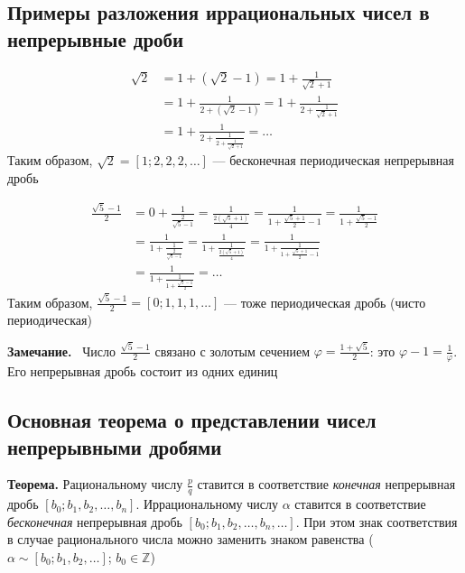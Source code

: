 \documentclass[a4paper,12pt]{article}
\newcommand{\myremark}{\textbf{Замечание.}\ }
\theoremstyle{definition}
\theoremstyle{plain}
\theoremstyle{remark}
\begin{document}
	\subsection{Примеры разложения иррациональных чисел в непрерывные дроби}
	
	\begin{tcolorbox}[colback=gray!5, colframe=gray!50, title=Пример: $\sqrt{2}$]
		\begin{align*}
			\sqrt{2} &= 1 + (\sqrt{2} - 1) = 1 + \frac{1}{\sqrt{2} + 1} \\
			&= 1 + \frac{1}{2 + (\sqrt{2} - 1)} = 1 + \frac{1}{2 + \frac{1}{\sqrt{2} + 1}} \\
			&= 1 + \frac{1}{2 + \frac{1}{2 + \frac{1}{\sqrt{2} + 1}}} = \dots
		\end{align*}
		Таким образом, $\sqrt{2} = [1; 2, 2, 2, \dots]$ — бесконечная периодическая непрерывная дробь
	\end{tcolorbox}
	
	\begin{tcolorbox}[colback=gray!5, colframe=gray!50, title=Пример: $\frac{\sqrt{5} - 1}{2}$ (золотое сечение)]
		\begin{align*}
			\frac{\sqrt{5} - 1}{2} &= 0 + \frac{1}{\frac{2}{\sqrt{5} - 1}} = \frac{1}{\frac{2(\sqrt{5} + 1)}{4}} = \frac{1}{1 + \frac{\sqrt{5} + 1}{2} - 1} = \frac{1}{1 + \frac{\sqrt{5} - 1}{2}} \\
			&= \frac{1}{1 + \frac{1}{\frac{2}{\sqrt{5} - 1}}} = \frac{1}{1 + \frac{1}{\frac{2(\sqrt{5} + 1)}{4}}} = \frac{1}{1 + \frac{1}{1 + \frac{\sqrt{5} + 1}{2} - 1}} \\
			&= \frac{1}{1 + \frac{1}{1 + \frac{\sqrt{5} - 1}{2}}} = \dots
		\end{align*}
		Таким образом, $\frac{\sqrt{5} - 1}{2} = [0; 1, 1, 1, \dots]$ — тоже периодическая дробь (чисто периодическая)
	\end{tcolorbox}
	
	\myremark
	Число $\frac{\sqrt{5} - 1}{2}$ связано с золотым сечением $\varphi = \frac{1+\sqrt{5}}{2}$: это $\varphi - 1 = \frac{1}{\varphi}$. Его непрерывная дробь состоит из одних единиц
	
	\subsection{Основная теорема о представлении чисел непрерывными дробями}
	
	\noindent \textbf{Теорема.}
	Рациональному числу $\frac{p}{q}$ ставится в соответствие \textit{конечная} непрерывная дробь $[b_0; b_1, b_2, \dots, b_n]$. Иррациональному числу $\alpha$ ставится в соответствие \textit{бесконечная} непрерывная дробь $[b_0; b_1, b_2, \dots, b_n, \dots]$. При этом знак соответствия в случае рационального числа можно заменить знаком равенства ($\alpha \sim [b_0; b_1, b_2, \dots]$; $b_0 \in \mathbb{Z}$)
	
\end{document}

